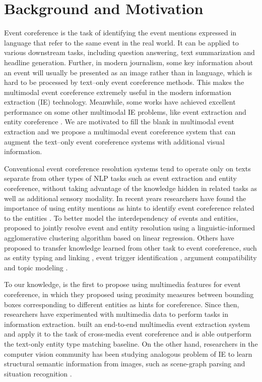 \documentclass[11pt,a4paper]{article}
\begin{document}
\section{Background and Motivation}
Event coreference is the task of identifying the event mentions expressed in language that refer to the same event in the real world. It can be applied to various downstream tasks, including question answering, text summarization and headline generation. Further, in modern journalism, some key information about an event will usually be presented as an image rather than in language, which is hard to be processed by text--only event coreference methods. This makes the multimodal event coreference extremely useful in the modern information extraction (IE) technology. Meanwhile, some works have achieved excellent performance on some other multimodal IE problems, like event extraction and entity coreference \cite{Li2020-crossmedia-ie}. We are motivated to fill the blank in multimodal event extraction and we propose a multimodal event coreference system that can augment the text--only event coreference systems with additional visual information.

Conventional event coreference resolution systems tend to operate only on texts separate from other types of NLP tasks such as event extraction and entity coreference, without taking advantage of the knowledge hidden in related tasks as well as additional sensory modality. In recent years researchers have found the importance of using entity mentions as hints to identify event coreference related to the entities \cite{Lee2012-joint-entity-event-coref, Lu2016-joint-event-coref, Barhom2019-joint-coref}. To better model the interdependency of events and entities, \cite{Lee2012-joint-entity-event-coref} proposed to jointly resolve event and entity resolution using a linguistic-informed agglomerative clustering algorithm based on linear regression. Others have proposed to transfer knowledge learned from other task to event coreference, such as entity typing and linking \cite{durrett-klein-2011-empirical}, event trigger identification \cite{Araki2015}, argument compatibility \cite{Huang2019-argument-compatibility} and topic modeling \cite{Choubey2018}.  

To our knowledge, \cite{Zhang2015-multimedia-coref} is the first to propose using multimedia features for event coreference, in which they proposed using proximity measures between bounding boxes corresponding to different entities as hints for coreference. Since then, researchers have experimented with multimedia data to perform tasks in information extraction. \cite{Li2020-crossmedia-ie} built an end-to-end multimedia event extraction system and apply it to the task of cross-media event coreference and is able outperform the text-only entity type matching baseline. On the other hand, researchers in the computer vision community has been studying analogous problem of IE to learn structural semantic information from images, such as scene-graph parsing and situation recognition \cite{Zellers2018-neural-motifs}.
\end{document}
